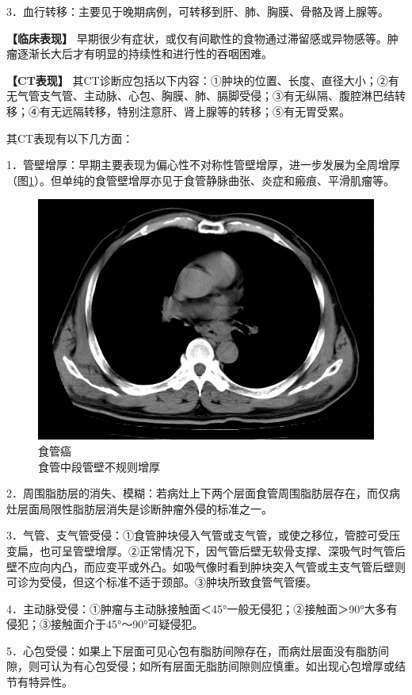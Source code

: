 3．血行转移：主要见于晚期病例，可转移到肝、肺、胸膜、骨骼及肾上腺等。

\textbf{【临床表现】}
早期很少有症状，或仅有间歇性的食物通过滞留感或异物感等。肿瘤逐渐长大后才有明显的持续性和进行性的吞咽困难。

\textbf{【CT表现】}
其CT诊断应包括以下内容：①肿块的位置、长度、直径大小；②有无气管支气管、主动脉、心包、胸膜、肺、膈脚受侵；③有无纵隔、腹腔淋巴结转移；④有无远隔转移，特别注意肝、肾上腺等的转移；⑤有无胃受累。

其CT表现有以下几方面：

1．管壁增厚：早期主要表现为偏心性不对称性管壁增厚，进一步发展为全周增厚（图\ref{fig17-1}）。但单纯的食管壁增厚亦见于食管静脉曲张、炎症和瘢痕、平滑肌瘤等。

\begin{figure}[!htbp]
 \centering
 \includegraphics[width=.7\textwidth,height=\textheight,keepaspectratio]{./images/Image00352.jpg}
 \captionsetup{justification=centering}
 \caption{食管癌\\{\small 食管中段管壁不规则增厚}}
 \label{fig17-1}
  \end{figure} 

2．周围脂肪层的消失、模糊：若病灶上下两个层面食管周围脂肪层存在，而仅病灶层面局限性脂肪层消失是诊断肿瘤外侵的标准之一。

3．气管、支气管受侵：①食管肿块侵入气管或支气管，或使之移位，管腔可受压变扁，也可呈管壁增厚。②正常情况下，因气管后壁无软骨支撑、深吸气时气管后壁不应向内凸，而应变平或外凸。如吸气像时看到肿块突入气管或主支气管后壁则可诊为受侵，但这个标准不适于颈部。③肿块所致食管气管瘘。

4．主动脉受侵：①肿瘤与主动脉接触面＜45°一般无侵犯；②接触面＞90°大多有侵犯；③接触面介于45°～90°可疑侵犯。

5．心包受侵：如果上下层面可见心包有脂肪间隙存在，而病灶层面没有脂肪间隙，则可认为有心包受侵；如所有层面无脂肪间隙则应慎重。如出现心包增厚或结节有特异性。

